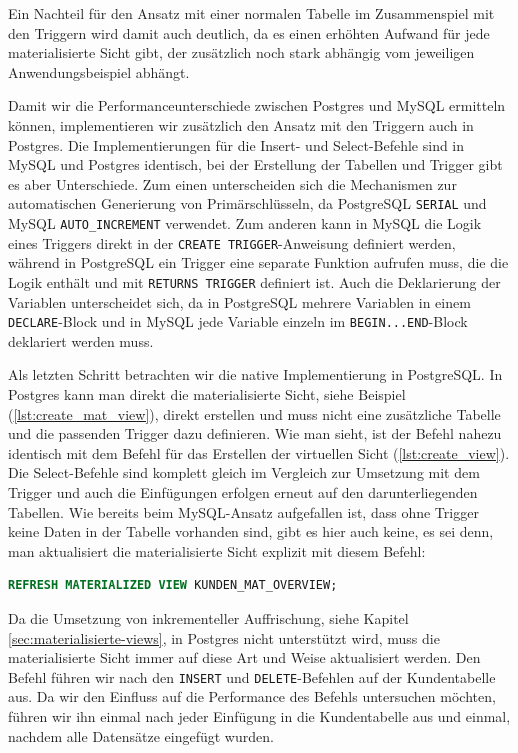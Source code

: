 Ein Nachteil für den Ansatz mit einer normalen Tabelle im Zusammenspiel mit den Triggern wird damit auch deutlich, da es einen erhöhten Aufwand für jede materialisierte Sicht gibt, der zusätzlich noch stark abhängig vom jeweiligen Anwendungsbeispiel abhängt.

Damit wir die Performanceunterschiede zwischen Postgres und MySQL ermitteln können, implementieren wir zusätzlich den Ansatz mit den Triggern auch in Postgres.
Die Implementierungen für die Insert- und Select-Befehle sind in MySQL und Postgres identisch, bei der Erstellung der Tabellen und Trigger gibt es aber Unterschiede.
Zum einen unterscheiden sich die Mechanismen zur automatischen Generierung von Primärschlüsseln, da PostgreSQL \texttt{SERIAL} und MySQL \texttt{AUTO\_INCREMENT} verwendet.
Zum anderen kann in MySQL die Logik eines Triggers direkt in der \texttt{CREATE TRIGGER}-Anweisung definiert werden, während in PostgreSQL ein Trigger eine separate Funktion aufrufen muss, die die Logik enthält und mit \texttt{RETURNS TRIGGER} definiert ist.
Auch die Deklarierung der Variablen unterscheidet sich, da in PostgreSQL mehrere Variablen in einem \texttt{DECLARE}-Block und in MySQL jede Variable einzeln im \texttt{BEGIN...END}-Block deklariert werden muss.

Als letzten Schritt betrachten wir die native Implementierung in PostgreSQL.
In Postgres kann man direkt die materialisierte Sicht, siehe Beispiel (\ref{lst:create_mat_view}), direkt erstellen und muss nicht eine zusätzliche Tabelle und die passenden Trigger dazu definieren.
Wie man sieht, ist der Befehl nahezu identisch mit dem Befehl für das Erstellen der virtuellen Sicht (\ref{lst:create_view}).
Die Select-Befehle sind komplett gleich im Vergleich zur Umsetzung mit dem Trigger und auch die Einfügungen erfolgen erneut auf den darunterliegenden Tabellen.
Wie bereits beim MySQL-Ansatz aufgefallen ist, dass ohne Trigger keine Daten in der Tabelle vorhanden sind, gibt es hier auch keine, es sei denn, man aktualisiert die materialisierte Sicht explizit mit diesem Befehl:

\vspace{-5pt}
\begin{lstlisting}[language=SQL,caption=Aktualisierung der materialisierten Sicht,label={lst:refresh-materialized-view}]
REFRESH MATERIALIZED VIEW KUNDEN_MAT_OVERVIEW;
\end{lstlisting}
\vspace{-5pt}

Da die Umsetzung von inkrementeller Auffrischung, siehe Kapitel \ref{sec:materialisierte-views}, in Postgres nicht unterstützt wird, muss die materialisierte Sicht immer auf diese Art und Weise aktualisiert werden.
Den Befehl führen wir nach den \texttt{INSERT} und \texttt{DELETE}-Befehlen auf der Kundentabelle aus.
Da wir den Einfluss auf die Performance des Befehls untersuchen möchten, führen wir ihn einmal nach jeder Einfügung in die Kundentabelle aus und einmal, nachdem alle Datensätze eingefügt wurden.

